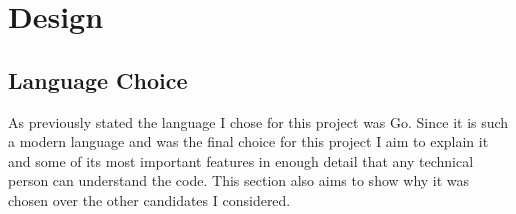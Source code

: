 \chapter{Design}




 


\section{Language Choice}
As previously stated the language I chose for this project was Go.
Since it is such a modern language and was the final choice for this project I aim to explain it and some of its most important features in enough detail that any technical person can understand the code.
This section also aims to show why it was chosen over the other candidates I considered.

